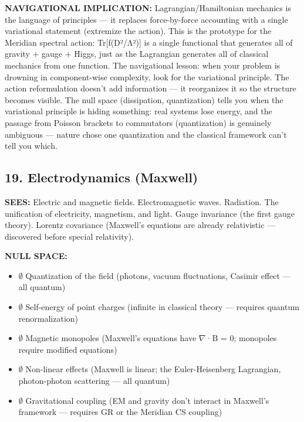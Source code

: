 \textbf{NAVIGATIONAL IMPLICATION:} Lagrangian/\allowbreak Hamiltonian mechanics is the language of principles — it replaces force-by-force accounting with a single variational statement (extremize the action). This is the prototype for the Meridian spectral action: Tr[f(D²/\allowbreak Λ²)] is a single functional that generates all of gravity + gauge + Higgs, just as the Lagrangian generates all of classical mechanics from one function. The navigational lesson: when your problem is drowning in component-wise complexity, look for the variational principle. The action reformulation doesn't add information — it reorganizes it so the structure becomes visible. The null space (dissipation, quantization) tells you when the variational principle is hiding something: real systems lose energy, and the passage from Poisson brackets to commutators (quantization) is genuinely ambiguous — nature chose one quantization and the classical framework can't tell you which.


\bigskip\noindent\makebox[\textwidth]{\color{rulegray}\rule{5cm}{0.3pt}}\bigskip


\subsection*{19. Electrodynamics (Maxwell)}


\textbf{SEES:} Electric and magnetic fields. Electromagnetic waves. Radiation. The unification of electricity, magnetism, and light. Gauge invariance (the first gauge theory). Lorentz covariance (Maxwell's equations are already relativistic — discovered before special relativity).


\textbf{NULL SPACE:}

\begin{itemize}[nosep,leftmargin=*]
  \item $\emptyset$ Quantization of the field (photons, vacuum fluctuations, Casimir effect — all quantum)
  \item $\emptyset$ Self-energy of point charges (infinite in classical theory — requires quantum renormalization)
  \item $\emptyset$ Magnetic monopoles (Maxwell's equations have $\nabla$·B = 0; monopoles require modified equations)
  \item $\emptyset$ Non-linear effects (Maxwell is linear; the Euler-Heisenberg Lagrangian, photon-photon scattering — all quantum)
  \item $\emptyset$ Gravitational coupling (EM and gravity don't interact in Maxwell's framework — requires GR or the Meridian CS coupling)
\end{itemize}



